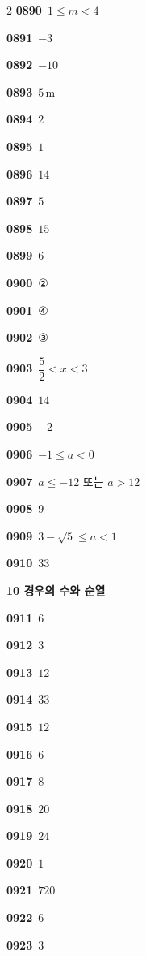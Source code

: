 \documentclass[10pt,a4paper]{article}
\begin{document}
\begin{multicols}{2}
\noindent\textbf{0890}\ $1\le m<4$\par
\noindent\textbf{0891}\ $-3$\par
\noindent\textbf{0892}\ $-10$\par
\noindent\textbf{0893}\ $5\,\mathrm{m}$\par
\noindent\textbf{0894}\ $2$\par
\noindent\textbf{0895}\ $1$\par
\noindent\textbf{0896}\ $14$\par
\noindent\textbf{0897}\ $5$\par
\noindent\textbf{0898}\ $15$\par
\noindent\textbf{0899}\ $6$\par
\noindent\textbf{0900}\ ②\par
\noindent\textbf{0901}\ ④\par
\noindent\textbf{0902}\ ③\par
\noindent\textbf{0903}\ $\dfrac{5}{2}<x<3$\par
\noindent\textbf{0904}\ $14$\par
\noindent\textbf{0905}\ $-2$\par
\noindent\textbf{0906}\ $-1\le a<0$\par
\noindent\textbf{0907}\ $a\le -12$ 또는 $a>12$\par
\noindent\textbf{0908}\ $9$\par
\noindent\textbf{0909}\ $3-\sqrt{5}\le a<1$\par
\noindent\textbf{0910}\ $33$\par
\noindent\textbf{10 경우의 수와 순열}\par\smallskip
\noindent\textbf{0911}\ $6$\par
\noindent\textbf{0912}\ $3$\par
\noindent\textbf{0913}\ $12$\par
\noindent\textbf{0914}\ $33$\par
\noindent\textbf{0915}\ $12$\par
\noindent\textbf{0916}\ $6$\par
\noindent\textbf{0917}\ $8$\par
\noindent\textbf{0918}\ $20$\par
\noindent\textbf{0919}\ $24$\par
\noindent\textbf{0920}\ $1$\par
\noindent\textbf{0921}\ $720$\par
\noindent\textbf{0922}\ $6$\par
\noindent\textbf{0923}\ $3$\par

\end{multicols}
\end{document}
